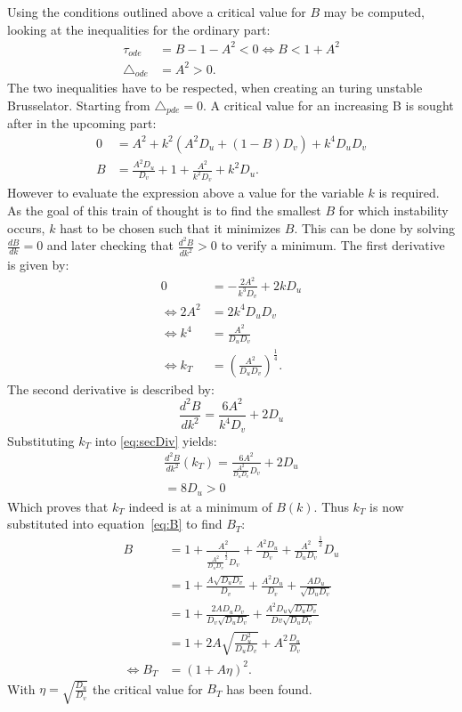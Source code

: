 Using the conditions outlined above a critical value for $B$ may be computed, looking at the inequalities for the ordinary part:
\begin{align}
\tau_{ode} &= B - 1 - A^2 < 0 \Leftrightarrow B < 1 + A^2 \\
\triangle_{ode} &= A^2 > 0.
\end{align}
The two inequalities have to be respected, when creating an turing unstable Brusselator. Starting from $\triangle_{pde} = 0$. A critical value for an increasing B is sought after in the upcoming part:
\begin{align}
0 &= A^2 + k^2 (A^2 D_u + (1 - B)D_v) + k^4D_u D_v \\
B &= \frac{A^2 D_u}{D_v} + 1 + \frac{A^2}{k^2 D_v} + k^2 D_u. 
\label{eq:B}
\end{align}
However to evaluate the expression above a value for the variable $k$ is required. As the goal of this train of thought is to find the smallest $B$ for which instability occurs, $k$ hast to be chosen such that it minimizes $B$. This can be done by solving $\frac{dB}{dk} = 0$ and later checking that $\frac{d^2 B}{dk^2} > 0$ to verify a minimum. The first derivative is given by:
\begin{align}
0 &= -\frac{2 A^2}{k^3 D_v} + 2kD_u \\
\Leftrightarrow 2A^2 &= 2k^4 D_u D_v \\
\Leftrightarrow k^4 &= \frac{A^2}{D_u D_v} \\
\Leftrightarrow k_T &= (\frac{A^2}{D_u D_v})^\frac{1}{4}.
\end{align}
The second derivative is described by:
\begin{equation}
\frac{d^2B}{dk^2} =\frac{6 A^2}{k^4 D_v} + 2 D_u
\label{eq:secDiv}
\end{equation}
Substituting $k_T$ into \ref{eq:secDiv} yields:
\begin{align}
\frac{d^2B}{dk^2}(k_T) = \frac{6A^2}{\frac{A^2}{D_u D_v} D_v} + 2D_u \\
= 8 D_u > 0 
\end{align}
Which proves that $k_T$ indeed is at a minimum of $B(k)$. Thus $k_T$ is now substituted into equation~\ref{eq:B} to find $B_T$:
\begin{align}
B &= 1 + \frac{A^2}{\frac{A^2}{D_u D_v}^\frac{1}{2} D_v} + \frac{A^2D_u}{D_v} + \frac{A^2}{D_u D_v}^\frac{1}{2} D_u \\
 &= 1 + \frac{A \sqrt{D_u D_v}}{D_v} + \frac{A^2 D_u}{D_v} + \frac{A D_u}{\sqrt{D_u D_v}} \\
 &= 1 + \frac{2AD_u D_v}{D_v \sqrt{D_u D_v}} + \frac{A^2 D_u \sqrt{D_u D_v}}{Dv \sqrt{D_u D_v}} \\
 &= 1 + 2A \sqrt{\frac{D_u^2}{D_u D_v}} + A^2\frac{D_u}{D_v} \\
\Leftrightarrow B_T &= (1 + A\eta)^2.
\end{align}
With $\eta = \sqrt{\frac{D_u}{D_v}}$ the critical value for $B_T$ has been found. 

